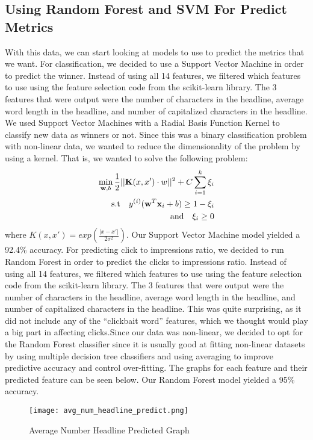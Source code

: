 \documentclass{article}
\begin{document}
\subsection{Using Random Forest and SVM For Predict Metrics}
With this data,  we can start looking at models to use to predict the metrics that we want.  For classification, we decided to use a Support Vector Machine in order to predict the winner. Instead of using all 14 features, we filtered which features to use using the feature selection code from the scikit-learn library. The 3 features that were output were the number of characters in the headline, average word length in the headline, and number of capitalized characters in the headline. We used Support Vector Machines with a Radial Basis Function Kernel to classify new data as winners or not. Since this was a binary classification problem with non-linear data, we wanted to reduce the dimensionality of the problem by using a kernel. That is, we wanted to solve the following problem: 
\begin{align*}
\min_{\vb w, b} \frac{1}{2}\vert \vert \vb K(x, x') \cdot w \vert \vert^2 + C\sum_{i=1}^{k} \xi_{i} \\
\quad \textrm{s.t} \quad  y^{(i)}(\vb w^T \vb x_{i} + b) \geq 1 - \xi_{i} \\
\quad \textrm{and} \quad \xi_{i} \geq 0
\end{align*}
where $K(x, x') = exp( \frac{\vert x - x' \vert}{2\sigma^2})$.  Our Support Vector Machine model yielded a 92.4\% accuracy.  For predicting click to impressions ratio,  we decided to run Random Forest in order to predict the clicks to impressions ratio. Instead of using all 14 features, we filtered which features to use using the feature selection code from the scikit-learn library.  The 3 features that were output were the number of characters in the headline, average word length in the headline, and number of capitalized characters in the headline. This was quite surprising, as it did not include any of the “clickbait word” features, which we thought would play a big part in affecting clicks.Since our data was non-linear, we decided to opt for the Random Forest classifier since it is usually good at fitting non-linear datasets by using multiple decision tree classifiers and using averaging to improve predictive accuracy and control over-fitting.  The graphs for each feature and their predicted feature can be seen below.  Our Random Forest model yielded a 95\% accuracy.

\begin{figure}[h]
\centering
\texttt{[image: avg\_num\_headline\_predict.png]}
\caption{Average Number Headline Predicted Graph}
\end{figure} 
\end{document}
